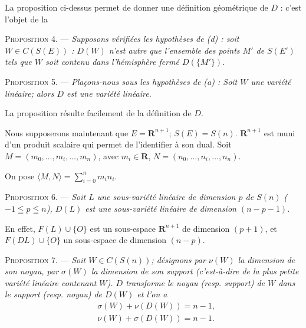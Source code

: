 \documentclass[11pt]{article}
\newcommand{\R}{\boldsymbol{R}}
\newenvironment{prop}[1][]{\par\medskip\noindent\textsc{Proposition #1.} --- \itshape}{\par\medskip}
\newenvironment{proof}[1][]{\par}{\par}
\begin{document}
La proposition ci-dessus permet de donner une définition géométrique de $D$ : c'est l'objet de la

\begin{prop}[4]
Supposons vérifiées les hypothèses de (\textit{d}) : soit $W\in C(S(E))$ : $D(W)$ n'est autre que
l'ensemble des points $M'$ de $S(E')$ tels que $W$ soit contenu dans l'hémisphère fermé
$D(\{M'\})$.
\end{prop}

\begin{prop}[5]
Plaçons-nous sous les hypothèses de (\textit{a}) : Soit $W$ une variété linéaire; alors $D$ est
une variété linéaire.
\end{prop}

\begin{proof}
La proposition résulte facilement de la définition de $D$.
\end{proof}

Nous supposerons maintenant que $E=\R^{n+1}$; $S(E)=S(n)$. $\R^{n+1}$ est muni d'un produit
scalaire qui permet de l'identifier à son dual. Soit $M=(m_0, \ldots, m_i, \ldots, m_n)$, avec
$m_i\in\R$, $N=(n_0, \ldots, n_i, \ldots, n_n)$.

On pose $\langle M, N\rangle=\sum_{i=0}^{n}m_in_i$.

\begin{prop}[6]
Soit $L$ une sous-variété linéaire de dimension $p$ de $S(n)$ ($-1\leqq p\leqq n$), $D(L)$ est
une sous-variété linéaire de dimension $(n-p-1)$.
\end{prop}

\begin{proof}
En effet, $F(L)\cup\{O\}$ est un sous-espace $\R^{n+1}$ de dimension $(p+1)$, et
$F(DL)\cup\{O\}$ un sous-espace de dimension $(n-p)$.
\end{proof}

\begin{prop}[7]
Soit $W\in C(S(n))$; désignons par $\nu(W)$ la dimension de son noyau, par $\sigma(W)$ la dimension
de son support (c'est-à-dire de la plus
petite variété linéaire contenant $W$). $D$ transforme le noyau (resp. support) de $W$ dans le
support (resp. noyau) de $D(W)$ et l'on a
\[ \begin{aligned} &\sigma(W)+\nu(D(W))=n-1,\\ &\nu(W)+\sigma(D(W))=n-1. \end{aligned} \]
\end{prop}
\end{document}
